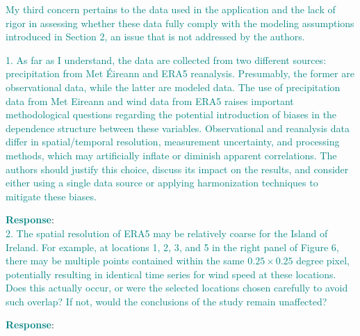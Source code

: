 \documentclass[a4paper,12pt]{article}
\begin{document}

\noindent \textcolor{teal}{
My third concern pertains to the data used in the application and the lack of rigor in assessing
whether these data fully comply with the modeling assumptions introduced in Section 2, an issue
that is not addressed by the authors.
}

\noindent \textcolor{teal}{
1. As far as I understand, the data are collected from two different sources: precipitation from
Met Éireann and ERA5 reanalysis. 
Presumably, the former are observational data, while the latter are modeled data. 
The use of precipitation data from Met Eireann and wind data from ERA5 raises important methodological questions regarding the potential introduction of biases in the dependence structure between these variables. 
Observational and reanalysis data differ in spatial/temporal resolution, measurement uncertainty, and processing methods, which may artificially inflate or diminish apparent correlations. 
The authors should justify this choice, discuss its impact on the results, and consider either using a single data source or applying harmonization techniques to mitigate these biases.
}

\noindent \textcolor{teal}{\bf Response}: \\


\noindent \textcolor{teal}{
2. The spatial resolution of ERA5 may be relatively coarse for the Island of Ireland. 
For example, at locations 1, 2, 3, and 5 in the right panel of Figure 6, there may be multiple points contained within the same $0.25 \times 0.25$ degree pixel, potentially resulting in identical time series for wind speed at these locations. 
Does this actually occur, or were the selected locations chosen carefully to avoid such overlap? 
If not, would the conclusions of the study remain unaffected?
}

\noindent \textcolor{teal}{\bf Response}: \\

\end{document}
